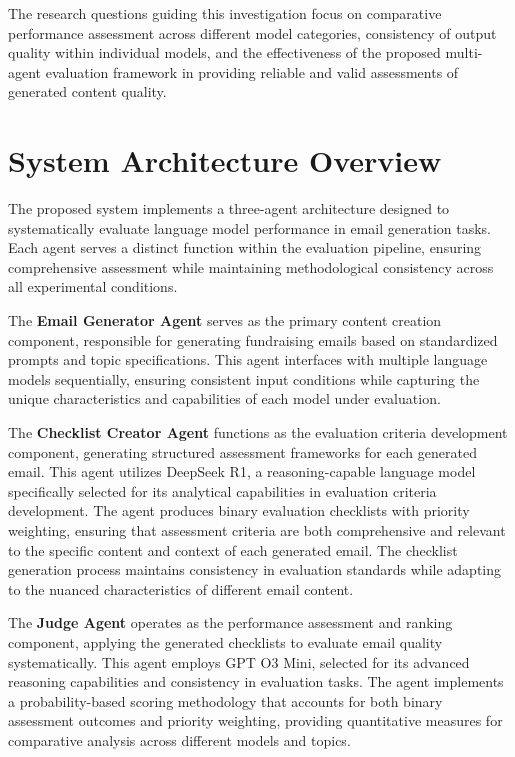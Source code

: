 The research questions guiding this investigation focus on comparative performance assessment across different model categories, consistency of output quality within individual models, and the effectiveness of the proposed multi-agent evaluation framework in providing reliable and valid assessments of generated content quality.

\section{System Architecture Overview}
\label{sec:system-architecture}

The proposed system implements a three-agent architecture designed to systematically evaluate language model performance in email generation tasks. Each agent serves a distinct function within the evaluation pipeline, ensuring comprehensive assessment while maintaining methodological consistency across all experimental conditions.

The \textbf{Email Generator Agent} serves as the primary content creation component, responsible for generating fundraising emails based on standardized prompts and topic specifications. This agent interfaces with multiple language models sequentially, ensuring consistent input conditions while capturing the unique characteristics and capabilities of each model under evaluation.

The \textbf{Checklist Creator Agent} functions as the evaluation criteria development component, generating structured assessment frameworks for each generated email. This agent utilizes DeepSeek R1, a reasoning-capable language model specifically selected for its analytical capabilities in evaluation criteria development. The agent produces binary evaluation checklists with priority weighting, ensuring that assessment criteria are both comprehensive and relevant to the specific content and context of each generated email. The checklist generation process maintains consistency in evaluation standards while adapting to the nuanced characteristics of different email content.

The \textbf{Judge Agent} operates as the performance assessment and ranking component, applying the generated checklists to evaluate email quality systematically. This agent employs GPT O3 Mini, selected for its advanced reasoning capabilities and consistency in evaluation tasks. The agent implements a probability-based scoring methodology that accounts for both binary assessment outcomes and priority weighting, providing quantitative measures for comparative analysis across different models and topics.


